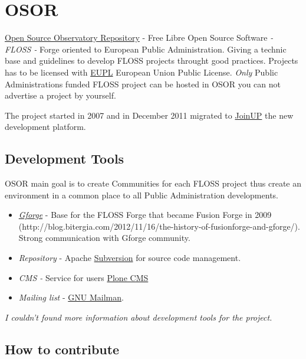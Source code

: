 \section{OSOR}
\label{sec:osor}

\par \href{https://joinup.ec.europa.eu/page/osor.eu}{Open Source Observatory Repository} - Free Libre Open Source Software \textit{- FLOSS -} Forge oriented to European Public Administration. Giving a technic base and guidelines to develop FLOSS projects throught good practices. Projects has to be licensed with \href{http://joinup.ec.europa.eu/software/page/eupl/licence-eupl}{EUPL} European Union Public License. \textit{Only} Public Administrations funded FLOSS project can be hosted in OSOR you can not advertise a project by yourself.

\par The project started in 2007 and in December 2011 migrated to \href{https://joinup.ec.europa.eu/page/osor.eu}{JoinUP} the new development platform.

\subsection{Development Tools}

\par OSOR main goal is to create Communities for each FLOSS project thus create an environment in a common place to all Public Administration developments.

\begin{itemize}
	\item \textit{\href{http://gforge.com/gf/}{Gforge}} - Base for the FLOSS Forge that became Fusion Forge in 2009 (http://blog.bitergia.com/2012/11/16/the-history-of-fusionforge-and-gforge/). Strong communication with Gforge community.
	\item \textit{Repository} - Apache \href{http://subversion.apache.org/}{Subversion} for source code management.
	\item \textit{CMS -} Service for users \href{http://plone.org/}{Plone CMS}
	\item \textit{Mailing list} - \href{http://www.gnu.org/software/mailman/}{GNU Mailman}.
\end{itemize}\textit{I couldn't found more information about development tools for the project.}

\subsection{How to contribute}

